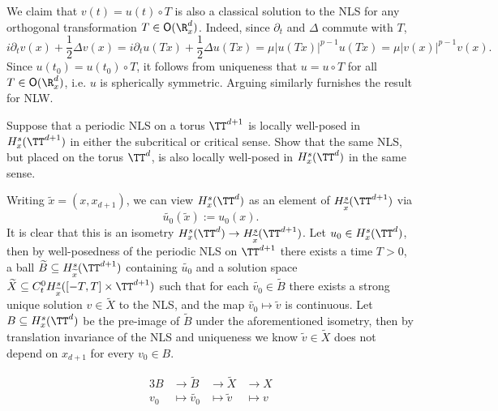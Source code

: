 \begin{solution}
	We claim that $v(t) = u (t) \circ T$ is also a classical solution to the NLS for any orthogonal transformation $T \in \mathsf O (\R^d_x)$. Indeed, since $\partial_t$ and $\Delta$ commute with $T$, 
		\[ i \partial_t v  (x) + \frac12 \Delta v (x) = i \partial_t u (Tx) + \frac12 \Delta u (Tx) = \mu |u(Tx)|^{p - 1} u(Tx) = \mu |v(x)|^{p - 1} v(x). \]
	Since $u(t_0) = u(t_0) \circ T$, it follows from uniqueness that $u = u \circ T$ for all $T \in \mathsf O(\R^d_x)$, i.e. $u$ is spherically symmetric. Arguing similarly furnishes the result for NLW. 
\end{solution}

\begin{statement}
	Suppose that a periodic NLS on a torus $\TT^{d + 1}$ is locally well-posed in $H^s_{x} (\TT^{d + 1})$ in either the subcritical or critical sense. Show that the same NLS, but placed on the torus $\TT^d$, is also locally well-posed in $H^s_x (\TT^d)$ in the same sense.
\end{statement}

\begin{solution}
	Writing $\widetilde x = (x, x_{d + 1})$, we can view $H^s_x (\TT^d)$ as an element of $H^s_{\widetilde x} (\TT^{d + 1})$ via
		\[ \widetilde{u_0} (\widetilde x) := u_0 (x).  \]
	It is clear that this is an isometry $H^s_x (\TT^d) \to H^{s}_{\widetilde x} (\TT^{d + 1})$. Let $u_0 \in H^s_x (\TT^d)$, then by well-posedness of the periodic NLS on $\TT^{d + 1}$ there exists a time $T > 0$, a ball $\widetilde B\subseteq H^s_{\widetilde x} (\TT^{d + 1})$ containing $\widetilde{u_0}$ and a solution space $\widetilde X \subseteq C^0_t H^s_{\widetilde x} ([-T,T] \times \TT^{d + 1})$ such that for each $\widetilde{v_0} \in \widetilde B$ there exists a strong unique solution $v \in \widetilde X$ to the NLS, and the map $\widetilde{v_0} \mapsto \widetilde v$ is continuous. Let $B \subseteq H^s_x (\TT^d)$ be the pre-image of $\widetilde B$ under the aforementioned isometry, then by translation invariance of the NLS and uniqueness we know $\widetilde v \in \widetilde X$ does not depend on $x_{d + 1}$ for every $v_0 \in B$. 
	
	
	\begin{alignat*}{3}
		B &\longrightarrow \widetilde B &\longrightarrow \widetilde X &\longrightarrow X \\
		v_0 &\longmapsto \widetilde{v_0} &\longmapsto \widetilde v &\longmapsto v 
	\end{alignat*}
\end{solution}

